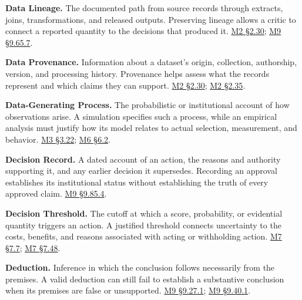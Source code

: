 \noindent\textbf{Data Lineage.} The documented path from source records through
extracts, joins, transformations, and released outputs. Preserving
lineage allows a critic to connect a reported quantity to the decisions
that produced it.
\href{Marketing_Analytics_Lecture_Notes.pdf\#M02-data-have-a-production-history}{M2
§2.30};
\hyperref[M09-responsibility-for-the-artifact-and-its-uses]{M9
§9.65.7}.

\noindent\textbf{Data Provenance.} Information about a dataset's origin,
collection, authorship, version, and processing history. Provenance
helps assess what the records represent and which claims they can
support.
\href{Marketing_Analytics_Lecture_Notes.pdf\#M02-data-have-a-production-history}{M2
§2.30};
\href{Marketing_Analytics_Lecture_Notes.pdf\#M02-reproducing-a-result-and-assessing-its-records}{M2
§2.35}.

\noindent\textbf{Data-Generating Process.} The probabilistic or institutional
account of how observations arise. A simulation specifies such a
process, while an empirical analysis must justify how its model relates
to actual selection, measurement, and behavior.
\href{Marketing_Analytics_Lecture_Notes.pdf\#M03-unbiased-estimation-and-the-consequences-of-error}{M3
§3.22};
\href{Marketing_Analytics_Lecture_Notes.pdf\#M06-why-the-treated-untreated-difference-can-be-biased}{M6
§6.2}.

\noindent\textbf{Decision Record.} A dated account of an action, the reasons and
authority supporting it, and any earlier decision it supersedes.
Recording an approval establishes its institutional status without
establishing the truth of every approved claim.
\hyperref[M09-correction-and-responsibility]{M9
§9.85.4}.

\noindent\textbf{Decision Threshold.} The cutoff at which a score, probability,
or evidential quantity triggers an action. A justified threshold
connects uncertainty to the costs, benefits, and reasons associated with
acting or withholding action.
\href{Marketing_Analytics_Lecture_Notes.pdf\#M07-thresholds-should-reflect-the-decision}{M7
§7.7};
\href{Marketing_Analytics_Lecture_Notes.pdf\#M07-prediction-thresholds-and-consumer-consequences}{M7
§7.48}.

\noindent\textbf{Deduction.} Inference in which the conclusion follows
necessarily from the premises. A valid deduction can still fail to
establish a substantive conclusion when its premises are false or
unsupported.
\hyperref[M09-premises-consequences-and-counterexamples]{M9
§9.27.1};
\hyperref[M09-validity-soundness-and-evidential-support]{M9
§9.40.1}.

